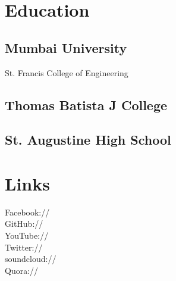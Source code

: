 \documentclass[hidelinks]{deedy-resume-openfont}
\renewcommand{\sectionsep}[0]{\vspace{8pt}}
\begin{document}


%
%

%
%



%
%

\begin{minipage}[t]{0.33\textwidth}


\section{Education}

\subsection{Mumbai University}
St. Francis College of Engineering \\
\sectionsep

\subsection{Thomas Batista J College}
\sectionsep

\subsection{St. Augustine High School}
\sectionsep


\section{Links}
Facebook:// \href{https://facebook.com/rihenp}{} \\
GitHub:// \href{https://github.com/rihbyne}{} \\
YouTube:// \href{https://www.youtube.com/c/RihanPereira}{} \\
Twitter:// \href{https://twitter.com/rihbyne}{} \\
soundcloud:// \href{http://www.soundcloud.com/rihbyne}{} \\
Quora://  \href{https://www.quora.com/Rihan-Pereira}{}


\end{minipage}
\end{document}
